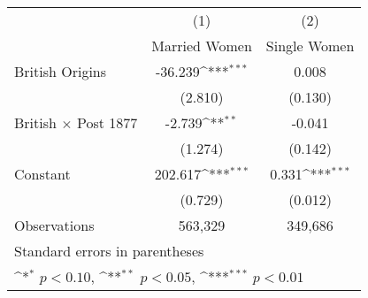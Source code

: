 {
\def\sym#1{\ifmmode^{#1}\else\(^{#1}\)\fi}
\begin{tabular}{l*{2}{c}}
\hline\hline
                    &\multicolumn{1}{c}{(1)}&\multicolumn{1}{c}{(2)}\\
                    &\multicolumn{1}{c}{Married Women}&\multicolumn{1}{c}{Single Women}\\
\hline
British Origins     &     -36.239\sym{***}&       0.008         \\
                    &     (2.810)         &     (0.130)         \\
[1em]
British $\times$ Post 1877&      -2.739\sym{**} &      -0.041         \\
                    &     (1.274)         &     (0.142)         \\
[1em]
Constant            &     202.617\sym{***}&       0.331\sym{***}\\
                    &     (0.729)         &     (0.012)         \\
\hline
Observations        &     563,329         &     349,686         \\
\hline\hline
\multicolumn{3}{l}{\footnotesize Standard errors in parentheses}\\
\multicolumn{3}{l}{\footnotesize \sym{*} \(p<0.10\), \sym{**} \(p<0.05\), \sym{***} \(p<0.01\)}\\
\end{tabular}
}
